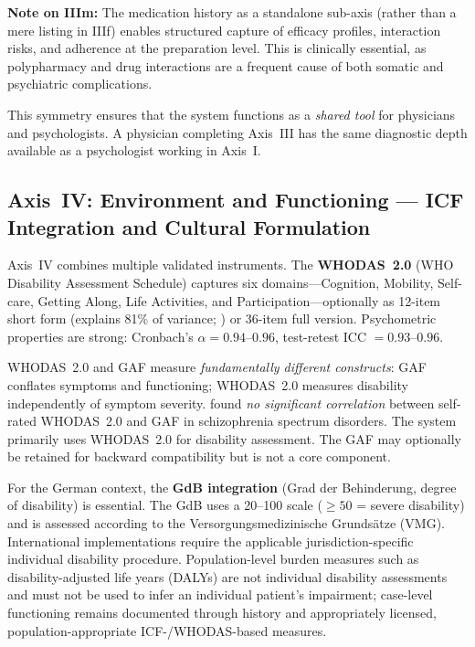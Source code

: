 \documentclass[11pt,a4paper]{article}
\begin{document}
\textbf{Note on IIIm:} The medication history as a standalone sub-axis (rather than a mere listing in IIIf) enables structured capture of efficacy profiles, interaction risks, and adherence at the preparation level. This is clinically essential, as polypharmacy and drug interactions are a frequent cause of both somatic and psychiatric complications.

This symmetry ensures that the system functions as a \textit{shared tool} for physicians and psychologists. A physician completing Axis~III has the same diagnostic depth available as a psychologist working in Axis~I.

\subsection{Axis~IV: Environment and Functioning --- ICF Integration and Cultural Formulation}
\label{sec:axis4}

Axis~IV combines multiple validated instruments. The \textbf{WHODAS~2.0} \citep{WHO2010} (WHO Disability Assessment Schedule) captures six domains---Cognition, Mobility, Self-care, Getting Along, Life Activities, and Participation---optionally as 12-item short form (explains 81\% of variance; \citealp{Luciano2010}) or 36-item full version. Psychometric properties are strong: Cronbach's $\alpha = 0.94$--$0.96$, test-retest ICC $= 0.93$--$0.96$.

WHODAS~2.0 and GAF measure \textit{fundamentally different constructs}: GAF conflates symptoms and functioning; WHODAS~2.0 measures disability independently of symptom severity. \citet{Gspandl2018} found \textit{no significant correlation} between self-rated WHODAS~2.0 and GAF in schizophrenia spectrum disorders. The system primarily uses WHODAS~2.0 for disability assessment. The GAF may optionally be retained for backward compatibility but is not a core component.

For the German context, the \textbf{GdB integration} (Grad der Behinderung, degree of disability) is essential. The GdB uses a 20--100 scale ($\geq 50$ = severe disability) and is assessed according to the Versorgungsmedizinische Grunds\"atze (VMG). International implementations require the applicable jurisdiction-specific individual disability procedure. Population-level burden measures such as disability-adjusted life years (DALYs) are not individual disability assessments and must not be used to infer an individual patient's impairment; case-level functioning remains documented through history and appropriately licensed, population-appropriate ICF-/WHODAS-based measures.
\end{document}
